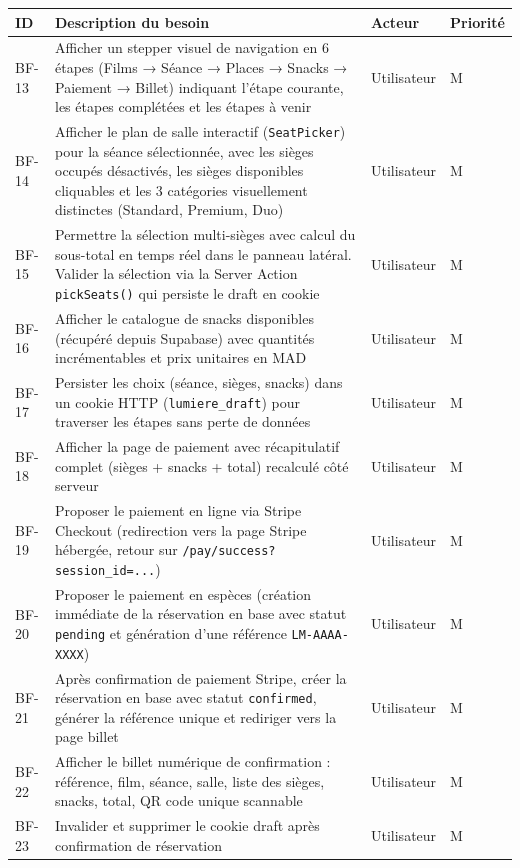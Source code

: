 \documentclass[12pt,a4paper,openany]{report}
\begin{document}
\begin{longtable}{p{1cm}p{6.5cm}lp{3.5cm}}
  \toprule
  \textbf{ID} & \textbf{Description du besoin} & \textbf{Acteur} & \textbf{Priorité} \\
  \midrule
  \endhead
  \bottomrule
  \endfoot

  BF-13 & Afficher un stepper visuel de navigation en 6 étapes (Films → Séance → Places → Snacks → Paiement → Billet) indiquant l'étape courante, les étapes complétées et les étapes à venir & Utilisateur & M \\[4pt]

  BF-14 & Afficher le plan de salle interactif (\texttt{SeatPicker}) pour la séance sélectionnée, avec les sièges occupés désactivés, les sièges disponibles cliquables et les 3 catégories visuellement distinctes (Standard, Premium, Duo) & Utilisateur & M \\[4pt]

  BF-15 & Permettre la sélection multi-sièges avec calcul du sous-total en temps réel dans le panneau latéral. Valider la sélection via la Server Action \texttt{pickSeats()} qui persiste le draft en cookie & Utilisateur & M \\[4pt]

  BF-16 & Afficher le catalogue de snacks disponibles (récupéré depuis Supabase) avec quantités incrémentables et prix unitaires en MAD & Utilisateur & M \\[4pt]

  BF-17 & Persister les choix (séance, sièges, snacks) dans un cookie HTTP (\texttt{lumiere\_draft}) pour traverser les étapes sans perte de données & Utilisateur & M \\[4pt]

  BF-18 & Afficher la page de paiement avec récapitulatif complet (sièges + snacks + total) recalculé côté serveur & Utilisateur & M \\[4pt]

  BF-19 & Proposer le paiement en ligne via Stripe Checkout (redirection vers la page Stripe hébergée, retour sur \texttt{/pay/success?session\_id=...}) & Utilisateur & M \\[4pt]

  BF-20 & Proposer le paiement en espèces (création immédiate de la réservation en base avec statut \texttt{pending} et génération d'une référence \texttt{LM-AAAA-XXXX}) & Utilisateur & M \\[4pt]

  BF-21 & Après confirmation de paiement Stripe, créer la réservation en base avec statut \texttt{confirmed}, générer la référence unique et rediriger vers la page billet & Utilisateur & M \\[4pt]

  BF-22 & Afficher le billet numérique de confirmation : référence, film, séance, salle, liste des sièges, snacks, total, QR code unique scannable & Utilisateur & M \\[4pt]

  BF-23 & Invalider et supprimer le cookie draft après confirmation de réservation & Utilisateur & M \\
\end{longtable}
\end{document}
